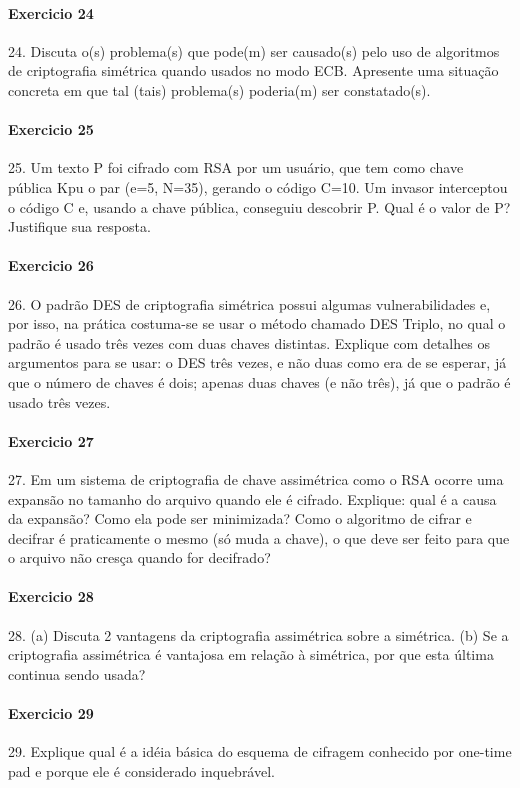 \documentclass[10pt,a4paper]{report}
\begin{document}
\paragraph{Exercicio 24}
24. Discuta o(s) problema(s) que pode(m) ser causado(s) pelo uso de algoritmos de criptografia simétrica quando usados no modo ECB. Apresente uma situação concreta em que tal (tais) problema(s) poderia(m) ser constatado(s).
\paragraph{Exercicio 25}
25. Um texto P foi cifrado com RSA por um usuário, que tem como chave pública Kpu o par (e=5, N=35), gerando o código C=10. Um invasor interceptou o código C e, usando a chave pública, conseguiu descobrir P. Qual é o valor de P? Justifique sua resposta.
\paragraph{Exercicio 26}
26. O padrão DES de criptografia simétrica possui algumas vulnerabilidades e, por isso, na prática costuma-se se usar o método chamado DES Triplo, no qual o padrão é usado três vezes com duas chaves distintas. Explique com detalhes os argumentos para se usar:
o DES três vezes, e não duas como era de se esperar, já que o número de chaves é dois;
apenas duas chaves (e não três), já que o padrão é usado três vezes.
\paragraph{Exercicio 27}
27. Em um sistema de criptografia de chave assimétrica como o RSA ocorre uma expansão no tamanho do arquivo quando ele é cifrado. Explique:
qual é a causa da expansão?
Como ela pode ser minimizada?
Como o algoritmo de cifrar e decifrar é praticamente o mesmo (só muda a chave), o que deve ser feito para que o arquivo não cresça quando for decifrado?
\paragraph{Exercicio 28}
28. (a) Discuta 2 vantagens da criptografia assimétrica sobre a simétrica.
(b) Se a criptografia assimétrica é vantajosa em relação à simétrica, por que esta última continua sendo usada?
\paragraph{Exercicio 29}
29. Explique qual é a idéia básica do esquema de cifragem conhecido por one-time pad e porque ele é considerado inquebrável.
\end{document}
